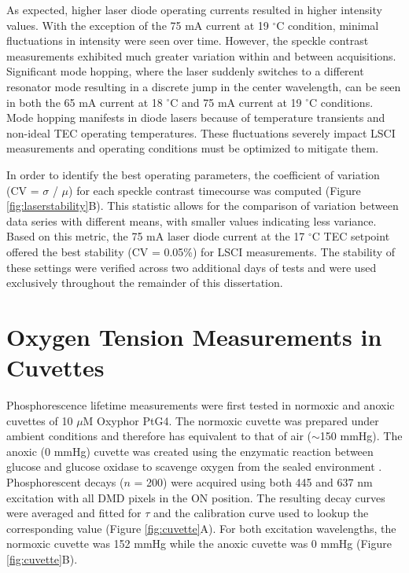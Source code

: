 As expected, higher laser diode operating currents resulted in higher intensity values. With the exception of the 75 mA current at 19 $^\circ$C condition, minimal fluctuations in intensity were seen over time. However, the speckle contrast measurements exhibited much greater variation within and between acquisitions. Significant mode hopping, where the laser suddenly switches to a different resonator mode resulting in a discrete jump in the center wavelength, can be seen in both the 65 mA current at 18 $^\circ$C and 75 mA current at 19 $^\circ$C conditions. Mode hopping manifests in diode lasers because of temperature transients and non-ideal TEC operating temperatures. These fluctuations severely impact LSCI measurements and operating conditions must be optimized to mitigate them.

In order to identify the best operating parameters, the coefficient of variation (CV = $\sigma$ / $\mu$) for each speckle contrast timecourse was computed (Figure \ref{fig:laserstability}B). This statistic allows for the comparison of variation between data series with different means, with smaller values indicating less variance. Based on this metric, the 75 mA laser diode current at the 17 $^\circ$C TEC setpoint offered the best stability (CV = 0.05\%) for LSCI measurements. The stability of these settings were verified across two additional days of tests and were used exclusively throughout the remainder of this dissertation.



\section{Oxygen Tension Measurements in Cuvettes}

Phosphorescence lifetime measurements were first tested in normoxic and anoxic cuvettes of 10 $\mu$M Oxyphor PtG4. The normoxic cuvette was prepared under ambient conditions and therefore has  equivalent to that of air ($\sim$150 mmHg). The anoxic (0 mmHg) cuvette was created using the enzymatic reaction between glucose and glucose oxidase to scavenge oxygen from the sealed environment \cite{Lo:1997he}. Phosphorescent decays ($n$ = 200) were acquired using both 445 and 637 nm excitation with all DMD pixels in the ON position. The resulting decay curves were averaged and fitted for $\tau$ and the calibration curve used to lookup the corresponding  value (Figure \ref{fig:cuvette}A). For both excitation wavelengths, the normoxic cuvette  was 152 mmHg while the anoxic cuvette  was 0 mmHg (Figure \ref{fig:cuvette}B).

